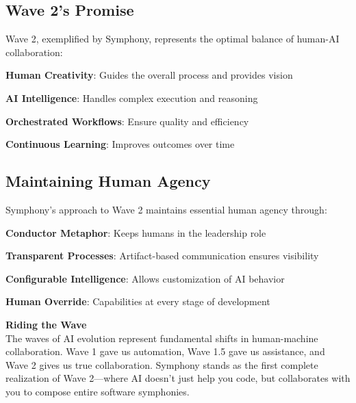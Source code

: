 \subsection{Wave 2's Promise}
\label{subsec:wave-2-promise}

Wave 2, exemplified by Symphony, represents the optimal balance of human-AI collaboration:

\begin{expandedlist}
    \item \textbf{Human Creativity}: Guides the overall process and provides vision
    \item \textbf{AI Intelligence}: Handles complex execution and reasoning
    \item \textbf{Orchestrated Workflows}: Ensure quality and efficiency
    \item \textbf{Continuous Learning}: Improves outcomes over time
\end{expandedlist}

\subsection{Maintaining Human Agency}
\label{subsec:human-agency}

Symphony's approach to Wave 2 maintains essential human agency through:

\begin{compactlist}
    \item \textbf{Conductor Metaphor}: Keeps humans in the leadership role
    \item \textbf{Transparent Processes}: Artifact-based communication ensures visibility
    \item \textbf{Configurable Intelligence}: Allows customization of AI behavior
    \item \textbf{Human Override}: Capabilities at every stage of development
\end{compactlist}

\begin{center}
\begin{tcolorbox}[
    colback=brandAccent!10,
    colframe=brandAccent,
    boxrule=2pt,
    arc=5pt,
    width=0.9\textwidth
]
\textbf{Riding the Wave}\\[0.5em]
The waves of AI evolution represent fundamental shifts in human-machine collaboration. Wave 1 gave us automation, Wave 1.5 gave us assistance, and Wave 2 gives us true collaboration. Symphony stands as the first complete realization of Wave 2—where AI doesn't just help you code, but collaborates with you to compose entire software symphonies.
\end{tcolorbox}
\end{center}
